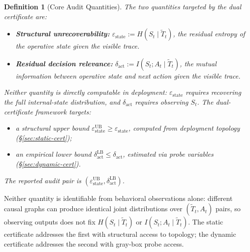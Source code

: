 \documentclass{article}
\newtheorem{definition}{Definition}
\begin{document}
\begin{definition}[Core Audit Quantities]
\label{def:certs}
The two quantities targeted by the dual certificate are:
\begin{itemize}
  \item \textbf{Structural unrecoverability:} $\varepsilon_\text{state} := H(S_t \mid \tilde T_t)$, the residual entropy of the operative state given the visible trace.
  \item \textbf{Residual decision relevance:} $\delta_\text{act} := I(S_t; A_t \mid \tilde T_t)$, the mutual information between operative state and next action given the visible trace.
\end{itemize}
Neither quantity is directly computable in deployment: $\varepsilon_\text{state}$ requires recovering the full internal-state distribution, and $\delta_\text{act}$ requires observing $S_t$. The dual-certificate framework targets:
\begin{itemize}
  \item a \emph{structural upper bound} $\varepsilon_\text{state}^\text{UB} \geq \varepsilon_\text{state}$, computed from deployment topology (\S\ref{sec:static-cert});
  \item an \emph{empirical lower bound} $\delta_\text{act}^\text{LB} \leq \delta_\text{act}$, estimated via probe variables (\S\ref{sec:dynamic-cert}).
\end{itemize}
The reported audit pair is $(\varepsilon_\text{state}^\text{UB}, \delta_\text{act}^\text{LB})$.
\end{definition}

Neither quantity is identifiable from behavioral observations alone: different causal graphs can produce identical joint distributions over $(\tilde T_t, A_t)$ pairs, so observing outputs does not fix $H(S_t \mid \tilde T_t)$ or $I(S_t; A_t \mid \tilde T_t)$. The static certificate addresses the first with structural access to topology; the dynamic certificate addresses the second with gray-box probe access.
\end{document}
